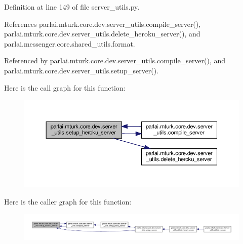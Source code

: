 Definition at line 149 of file server\+\_\+utils.\+py.



References parlai.\+mturk.\+core.\+dev.\+server\+\_\+utils.\+compile\+\_\+server(), parlai.\+mturk.\+core.\+dev.\+server\+\_\+utils.\+delete\+\_\+heroku\+\_\+server(), and parlai.\+messenger.\+core.\+shared\+\_\+utils.\+format.



Referenced by parlai.\+mturk.\+core.\+dev.\+server\+\_\+utils.\+compile\+\_\+server(), and parlai.\+mturk.\+core.\+dev.\+server\+\_\+utils.\+setup\+\_\+server().

Here is the call graph for this function\+:
\nopagebreak
\begin{figure}[H]
\begin{center}
\leavevmode
\includegraphics[width=350pt]{namespaceparlai_1_1mturk_1_1core_1_1dev_1_1server__utils_a138743e96f495bce1535782ffa0f38bf_cgraph}
\end{center}
\end{figure}
Here is the caller graph for this function\+:
\nopagebreak
\begin{figure}[H]
\begin{center}
\leavevmode
\includegraphics[width=350pt]{namespaceparlai_1_1mturk_1_1core_1_1dev_1_1server__utils_a138743e96f495bce1535782ffa0f38bf_icgraph}
\end{center}
\end{figure}
\mbox{\label{namespaceparlai_1_1mturk_1_1core_1_1dev_1_1server__utils_a914cced79fceeef08836d69d91e2d683}} 
